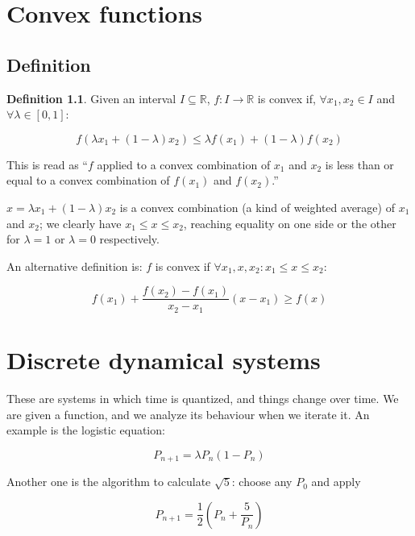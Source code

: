 \documentclass[12pt,a4paper]{report}
\numberwithin{equation}{section}
\theoremstyle{definition}
\newtheorem{definition}{Definition}[section]
\theoremstyle{remark}
\begin{document}
\chapter{Convex functions}

\section{Definition}

\begin{definition}
Given an interval $I \subseteq \mathbb{R}$, $f: I\rightarrow \mathbb{R}$ is convex if, $\forall x_1, x_2 \in I$ and $\forall \lambda \in [0, 1]$:

\begin{equation}
f(\lambda x_1 + (1-\lambda) x_2) \leq \lambda f(x_1) + (1-\lambda)f(x_2)
\end{equation}

This is read as ``$f$ applied to a convex combination of $x_1$ and $x_2$ is less than or equal to a convex combination of $f(x_1)$ and $f(x_2)$.''
\end{definition}

$x = \lambda x_1 + (1-\lambda) x_2$ is a convex combination (a kind of weighted average) of $x_1$ and $x_2$; we clearly have $x_1 \leq x \leq x_2$, reaching equality on one side or the other for $\lambda = 1$ or $\lambda = 0$ respectively.

An alternative definition is: $f$ is convex if $\forall x_1, x, x_2: x_1 \leq x \leq x_2$:

\begin{equation}
f(x_1) + \frac{f(x_2) - f(x_1)}{x_2 - x_1}(x - x_1) \geq f(x)
\end{equation}

\chapter{Discrete dynamical systems}

These are systems in which time is quantized, and things change over time. We are given a function, and we analyze its behaviour when we iterate it. An example is the logistic equation:

\begin{equation}
P_{n+1} = \lambda P_n (1- P_n)
\end{equation}

Another one is the algorithm to calculate $\sqrt{5}$: choose any $P_0$ and apply

\begin{equation}
P_{n+1} = \frac{1}{2} \left( P_n + \frac{5}{P_n} \right)
\end{equation}
\end{document}
